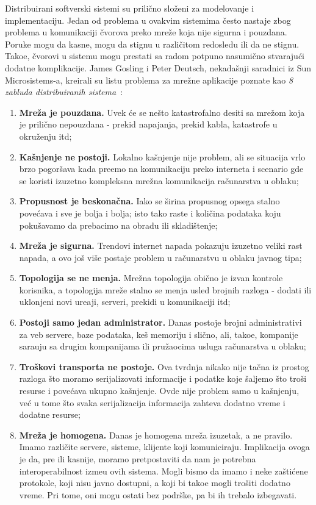 Distribuirani softverski sistemi su prilično slo\v zeni za modelovanje i implementaciju. Jedan od problema u ovakvim sistemima \v cesto nastaje zbog problema u komunikaciji \v cvorova preko mre\v ze koja nije sigurna i pouzdana. Poruke mogu da kasne, mogu da stignu u razli\v citom redosledu ili da ne stignu. Tako\dj e, \v cvorovi u sistemu mogu prestati sa radom potpuno nasumi\v cno stvaraju\'ci dodatne komplikacije. James Gosling i Peter Deutsch, nekada\v snji saradnici iz Sun Microsistems-a, kreirali su listu problema za mre\v zne aplikacije poznate kao \textit{8 zabluda distribuiranih sistema}~\cite{articleRotem}:

\begin{enumerate}[start=1,label={(\bfseries \arabic*)}]
	\item \textbf{Mre\v za je pouzdana.} Uvek \'ce se ne\v sto katastrofalno desiti sa mre\v zom koja je prili\v cno nepouzdana - prekid napajanja, prekid kabla, katastrofe u okru\v zenju itd;
	\item \textbf{Ka\v snjenje ne postoji.} Lokalno ka\v snjenje nije problem, ali se situacija vrlo brzo pogor\v sava kada pre\dj emo na komunikaciju preko interneta i scenario gde se koristi izuzetno kompleksna mre\v zna komunikacija ra\v cunarstva u oblaku;
	\item \textbf{Propusnost je beskona\v cna.} Iako se \v sirina propusnog opsega stalno pove\'cava i sve je bolja i bolja; isto tako raste i koli\v cina podataka koju poku\v savamo da prebacimo na obradu ili skladi\v stenje;
	\item \textbf{Mre\v za je sigurna.} Trendovi internet napada pokazuju izuzetno veliki rast napada, a ovo jo\v s vi\v se postaje problem u ra\v cunarstvu u oblaku javnog tipa;
	\item \textbf{Topologija se ne menja.} Mre\v zna topologija obi\v cno je izvan kontrole korisnika, a topologija mre\v ze stalno se menja usled brojnih razloga - dodati ili uklonjeni novi ure\dj aji, serveri, prekidi u komunikaciji itd;
	\item \textbf{Postoji samo jedan administrator.} Danas postoje brojni administrativi za veb servere, baze podataka, ke\v s memoriju i sli\v cno, ali, tako\dj e, kompanije sara\dj uju sa drugim kompanijama ili pru\v zaocima usluga ra\v cunarstva u oblaku;
	\item \textbf{Tro\v skovi transporta ne postoje.} Ova tvrdnja nikako nije ta\v cna iz prostog razloga \v sto moramo serijalizovati informacije i podatke koje \v saljemo \v sto tro\v si resurse i pove\'cava ukupno ka\v snjenje. Ovde nije problem samo u ka\v snjenju, ve\'c u tome \v sto svaka serijalizacija informacija zahteva dodatno vreme i dodatne resurse;
	\item \textbf{Mre\v za je homogena.} Danas je homogena mre\v za izuzetak, a ne pravilo. Imamo razli\v cite servere, sisteme, klijente koji komuniciraju. Implikacija ovoga je da, pre ili kasnije, moramo pretpostaviti da nam je potrebna interoperabilnost izme\dj u ovih sistema. Mogli bismo da imamo i neke za\v sti\'cene protokole, koji nisu javno dostupni, a koji bi tako\dj e mogli tro\v siti dodatno vreme. Pri tome, oni mogu ostati bez podr\v ske, pa bi ih trebalo izbegavati.
\end{enumerate}

